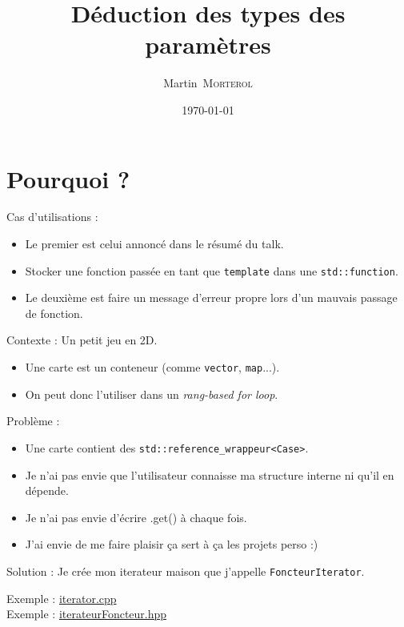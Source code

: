\documentclass{beamer}
\title{Déduction des types des paramètres}
\author{Martin~\textsc{Morterol}}
\date{\today}
\begin{document}
\begin{frame}[plain]
\titlepage
\end{frame}

\section{Pourquoi ?}
\begin{frame}
	Cas d'utilisations : 
	\begin{itemize}
		\item Le premier est celui annoncé dans le résumé du talk.
		\item[] Stocker une fonction passée en tant que \lstinline{template} dans une \lstinline{std::function}.
		\item Le deuxième est faire un message d'erreur propre lors d'un mauvais passage de fonction.
	\end{itemize}
\end{frame}
\begin{frame}
	Contexte : Un petit jeu en 2D.
    \begin{itemize}
    	\item Une carte est un conteneur (comme \lstinline{vector}, \lstinline{map}...).
    	\item On peut donc l'utiliser dans un \emph{rang-based for loop}.
    \end{itemize}
    Problème : 
    \begin{itemize}
    	\item Une carte contient des \lstinline{std::reference_wrappeur<Case>}.
    	\item Je n'ai pas envie que l'utilisateur connaisse ma structure interne ni qu'il en dépende.
    	\item Je n'ai pas envie d’écrire .get() à chaque fois. 
    	\item J'ai envie de me faire plaisir ça sert à ça les projets perso :)
    \end{itemize}
    Solution : Je crée mon iterateur maison que j'appelle \lstinline{FoncteurIterator}.
  
    
\end{frame}
\begin{frame}[containsverbatim]

	Exemple : \href{run:../code_demo/iterator.cpp}{iterator.cpp}	\\
    Exemple : \href{run:../code/src/iterateurFoncteur.hpp}{iterateurFoncteur.hpp}
\end{frame}
\end{document}
